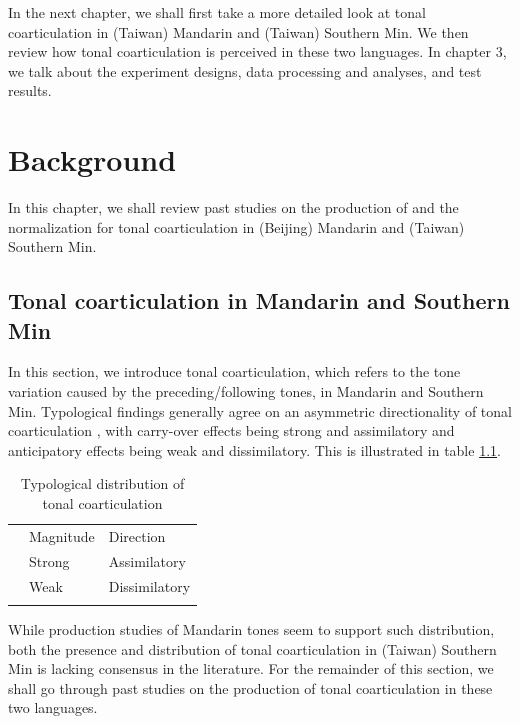 \documentclass[12pt]{report}
\begin{document}
\begin{CJK}{UTF8}{bsmi}
In the next chapter, we shall first take a more detailed look at tonal coarticulation in (Taiwan) Mandarin and (Taiwan) Southern Min. We then review how tonal coarticulation is perceived in these two languages. In chapter 3, we talk about the experiment designs, data processing and analyses, and test results.

\pagebreak
\chapter{Background}

In this chapter, we shall review past studies on the production of and the normalization for tonal coarticulation in (Beijing) Mandarin and (Taiwan) Southern Min. 
\section{Tonal coarticulation in Mandarin and Southern Min}\label{section:Tonal coarticulation in Taiwan Mandarin and Taiwan Southern Min}
In this section, we introduce tonal coarticulation, which refers to the tone variation caused by the preceding/following tones, in Mandarin and Southern Min. Typological findings generally agree on an asymmetric directionality of tonal coarticulation \citep{ChangHsieh2012}, with carry-over effects being strong and assimilatory and anticipatory effects being weak and dissimilatory. This is illustrated in table \ref{table:Typologicaldistribution}.

\begin{flushleft}
\begin{table}[hbt!]
\begin{tabularx}{\textwidth}{l|X|X|}
\hhline{~--}
 & Magnitude & Direction \\
\hhline{~|--}\noalign{\vspace*{\doublerulesep}}
\hhline{-||--}
\multicolumn{1}{|l||}{Carry-over} & Strong & Assimilatory\\
\hhline{-||--}
\multicolumn{1}{|l||}{Anticipatory} & Weak & Dissimilatory\\
\hhline{-||--}
\end{tabularx}
\caption{Typological distribution of tonal coarticulation}
\label{table:Typologicaldistribution}
\end{table}
\end{flushleft}

While production studies of Mandarin tones seem to support such distribution, both the presence and distribution of tonal coarticulation in (Taiwan) Southern Min is lacking consensus in the literature. For the remainder of this section, we shall go through past studies on the production of tonal coarticulation in these two languages.


\end{CJK}
\end{document}
